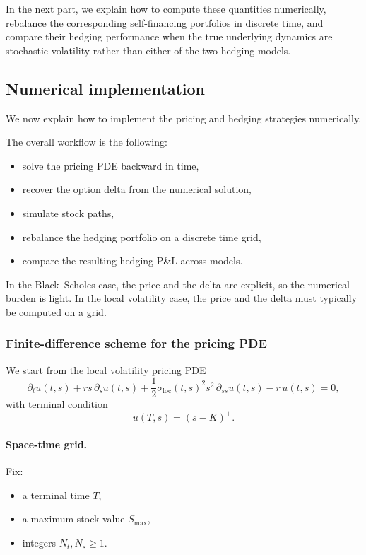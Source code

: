 \documentclass[11pt]{article}
\theoremstyle{plain}
\theoremstyle{definition}
\theoremstyle{remark}
\begin{document}
In the next part, we explain how to compute these quantities
numerically, rebalance the corresponding self-financing portfolios in
discrete time, and compare their hedging performance when the true
underlying dynamics are stochastic volatility rather than either of the
two hedging models.


\subsection{Numerical implementation}

We now explain how to implement the pricing and hedging strategies
numerically.

The overall workflow is the following:
\begin{itemize}[leftmargin=1.4em]
    \item solve the pricing PDE backward in time,
    \item recover the option delta from the numerical solution,
    \item simulate stock paths,
    \item rebalance the hedging portfolio on a discrete time grid,
    \item compare the resulting hedging P\&L across models.
\end{itemize}

In the Black--Scholes case, the price and the delta are explicit, so the
numerical burden is light.
In the local volatility case, the price and the delta must typically be
computed on a grid.

\subsubsection{Finite-difference scheme for the pricing PDE}

We start from the local volatility pricing PDE
\[
\partial_t u(t,s)
+
rs\,\partial_s u(t,s)
+
\frac12 \sigma_{\mathrm{loc}}(t,s)^2 s^2\,\partial_{ss}u(t,s)
-r\,u(t,s)
=
0,
\]
with terminal condition
\[
u(T,s)=(s-K)^+.
\]

\paragraph{Space-time grid.}
Fix:
\begin{itemize}[leftmargin=1.4em]
    \item a terminal time \(T\),
    \item a maximum stock value \(S_{\max}\),
    \item integers \(N_t,N_s\ge 1\).
\end{itemize}
\end{document}
